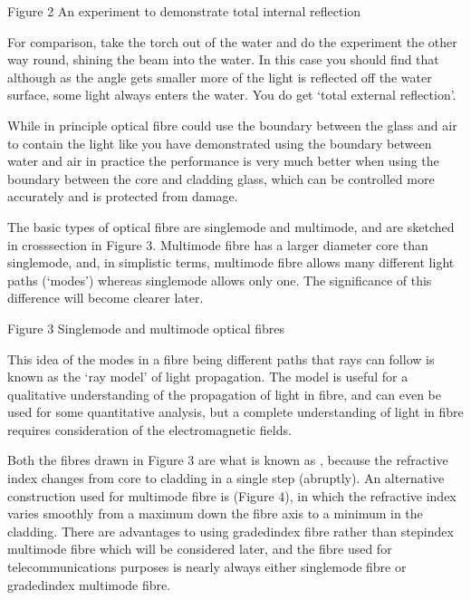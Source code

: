 \documentclass[letterpaper,10pt,english]{sphinxmanual}
\let\sphinxpxdimen\pdfpxdimen\else\newdimen\sphinxpxdimen
\begin{document}
\sphinxincludegraphics[width=511\sphinxpxdimen,height=464\sphinxpxdimen]{{t305_002i}.jpg}

Figure 2 An experiment to demonstrate total internal reflection

For comparison, take the torch out of the water and do the experiment the other way round, shining the beam into the water. In this case you should find that although as the angle gets smaller more of the light is reflected off the water surface, some light always enters the water. You do  get ‘total external reflection’.

While in principle optical fibre could use the boundary between the glass and air to contain the light \textendash{} like you have demonstrated using the boundary between water and air \textendash{} in practice the performance is very much better when using the boundary between the core and cladding glass, which can be controlled more accurately and is protected from damage.

The basic types of optical fibre are single\sphinxhyphen{}mode and multimode, and are sketched in cross\sphinxhyphen{}section in Figure 3. Multimode fibre has a larger diameter core than single\sphinxhyphen{}mode, and, in simplistic terms, multimode fibre allows many different light paths (‘modes’) whereas single\sphinxhyphen{}mode allows only one. The significance of this difference will become clearer later.

\sphinxincludegraphics[width=511\sphinxpxdimen,height=403\sphinxpxdimen]{{t305_003i}.jpg}

Figure 3 Single\sphinxhyphen{}mode and multimode optical fibres

This idea of the modes in a fibre being different paths that rays can follow is known as the ‘ray model’ of light propagation. The model is useful for a qualitative understanding of the propagation of light in fibre, and can even be used for some quantitative analysis, but a complete understanding of light in fibre requires consideration of the electromagnetic fields.

Both the fibres drawn in Figure 3 are what is known as , because the refractive index changes from core to cladding in a single step (abruptly). An alternative construction used for multimode fibre is  (Figure 4), in which the refractive index varies smoothly from a maximum down the fibre axis to a minimum in the cladding. There are advantages to using graded\sphinxhyphen{}index fibre rather than step\sphinxhyphen{}index multimode fibre which will be considered later, and the fibre used for
telecommunications purposes is nearly always either single\sphinxhyphen{}mode fibre or graded\sphinxhyphen{}index multimode fibre.
\end{document}
